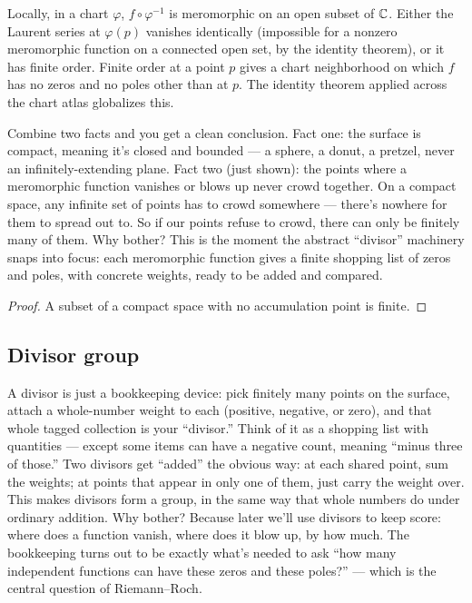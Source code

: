 \begin{proofsketch}
Locally, in a chart \(\varphi\), \(f\circ\varphi^{-1}\) is meromorphic on
an open subset of \(\mathbb{C}\). Either the Laurent series at \(\varphi(p)\)
vanishes identically (impossible for a nonzero meromorphic function on
a connected open set, by the identity theorem), or it has finite order.
Finite order at a point \(p\) gives a chart neighborhood on which \(f\)
has no zeros and no poles other than at \(p\). The identity theorem
applied across the chart atlas globalizes this.
\end{proofsketch}



\begin{layman}
Combine two facts and you get a clean conclusion. Fact one: the surface is
compact, meaning it's closed and bounded --- a sphere, a donut, a pretzel,
never an infinitely-extending plane. Fact two (just shown): the points where
a meromorphic function vanishes or blows up never crowd together. On a
compact space, any infinite set of points has to crowd somewhere --- there's
nowhere for them to spread out to. So if our points refuse to crowd, there
can only be finitely many of them. Why bother? This is the moment the
abstract ``divisor'' machinery snaps into focus: each meromorphic function
gives a finite shopping list of zeros and poles, with concrete
weights, ready to be added and compared.
\end{layman}

\begin{proof}\leanok
A subset of a compact space with no accumulation point is finite.
\end{proof}

\subsection{Divisor group}



\begin{layman}
A divisor is just a bookkeeping device: pick finitely many points on the
surface, attach a whole-number weight to each (positive, negative, or
zero), and that whole tagged collection is your ``divisor.'' Think of it
as a shopping list with quantities --- except some items can have a
negative count, meaning ``minus three of those.'' Two divisors get
``added'' the obvious way: at each shared point, sum the weights; at
points that appear in only one of them, just carry the weight over.
This makes divisors form a group, in the same way that whole numbers do
under ordinary addition. Why bother? Because later we'll use divisors to
keep score: where does a function vanish, where does it blow up, by how
much. The bookkeeping turns out to be exactly what's needed to ask
``how many independent functions can have these zeros and these poles?''
--- which is the central question of Riemann--Roch.
\end{layman}



